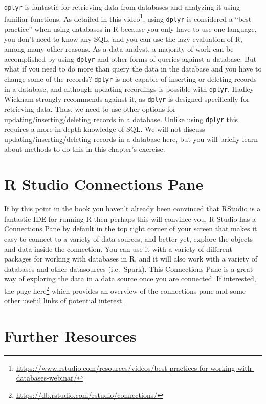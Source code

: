 \documentclass[
]{krantz}
\renewcommand{\href}[2]{#2\footnote{\url{#1}}}
\begin{document}
\texttt{dplyr} is fantastic for retrieving data from databases and analyzing it using familiar functions. As detailed in this \href{https://www.rstudio.com/resources/videos/best-practices-for-working-with-databases-webinar/}{video}, using \texttt{dplyr} is considered a ``best practice'' when using databases in R because you only have to use one language, you don't need to know any SQL, and you can use the lazy evaluation of R, among many other reasons. As a data analyst, a majority of work can be accomplished by using \texttt{dplyr} and other forms of queries against a database. But what if you need to do more than query the data in the database and you have to change some of the records? \texttt{dplyr} is not capable of inserting or deleting records in a database, and although updating recordings is possible with \texttt{dplyr}, Hadley Wickham strongly recommends against it, as \texttt{dplyr} is designed specifically for retrieving data. Thus, we need to use other options for updating/inserting/deleting records in a database. Unlike using \texttt{dplyr} this requires a more in depth knowledge of SQL. We will not discuss updating/inserting/deleting records in a database here, but you will briefly learn about methods to do this in this chapter's exercise.

\hypertarget{r-studio-connections-pane}{%
\section{R Studio Connections Pane}\label{r-studio-connections-pane}}

If by this point in the book you haven't already been convinced that RStudio is a fantastic IDE for running R then perhaps this will convince you. R Studio has a Connections Pane by default in the top right corner of your screen that makes it easy to connect to a variety of data sources, and better yet, explore the objects and data inside the connection. You can use it with a variety of different packages for working with databases in R, and it will also work with a variety of databases and other datasources (i.e.~Spark). This Connections Pane is a great way of exploring the data in a data source once you are connected. If interested, the page \href{https://db.rstudio.com/rstudio/connections/}{here} which provides an overview of the connections pane and some other useful links of potential interest.

\hypertarget{further-resources}{%
\section{Further Resources}\label{further-resources}}
\end{document}
